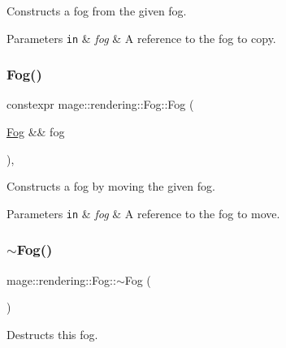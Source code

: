 Constructs a fog from the given fog.


\begin{DoxyParams}[1]{Parameters}
\mbox{\tt in}  & {\em fog} & A reference to the fog to copy. \\
\hline
\end{DoxyParams}
\hypertarget{classmage_1_1rendering_1_1_fog_aeed9b3fc18dabe37199c51ed7c4f5930}{}\label{classmage_1_1rendering_1_1_fog_aeed9b3fc18dabe37199c51ed7c4f5930} 
\subsubsection{\texorpdfstring{Fog()}{Fog()}\hspace{0.1cm}{\footnotesize\ttfamily [3/3]}}
{\footnotesize\ttfamily constexpr mage\+::rendering\+::\+Fog\+::\+Fog (\begin{DoxyParamCaption}\item[{\hyperlink{classmage_1_1rendering_1_1_fog}{Fog} \&\&}]{fog }\end{DoxyParamCaption})\hspace{0.3cm}{\ttfamily [default]}, {\ttfamily [noexcept]}}

Constructs a fog by moving the given fog.


\begin{DoxyParams}[1]{Parameters}
\mbox{\tt in}  & {\em fog} & A reference to the fog to move. \\
\hline
\end{DoxyParams}
\hypertarget{classmage_1_1rendering_1_1_fog_a3dfb641a2c5688172e3c4be7c91631a2}{}\label{classmage_1_1rendering_1_1_fog_a3dfb641a2c5688172e3c4be7c91631a2} 
\subsubsection{\texorpdfstring{$\sim$\+Fog()}{~Fog()}}
{\footnotesize\ttfamily mage\+::rendering\+::\+Fog\+::$\sim$\+Fog (\begin{DoxyParamCaption}{ }\end{DoxyParamCaption})\hspace{0.3cm}{\ttfamily [default]}}

Destructs this fog. 

